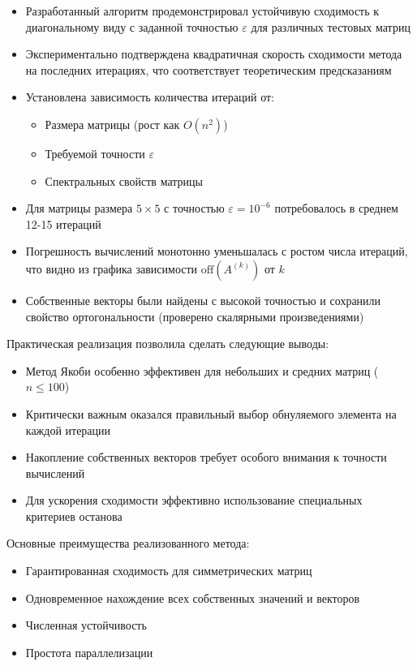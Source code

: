 \begin{itemize}
\item Разработанный алгоритм продемонстрировал устойчивую сходимость к диагональному виду с заданной точностью $\varepsilon$ для различных тестовых матриц

\item Экспериментально подтверждена квадратичная скорость сходимости метода на последних итерациях, что соответствует теоретическим предсказаниям

\item Установлена зависимость количества итераций от:
\begin{itemize}
\item Размера матрицы (рост как $O(n^2)$)
\item Требуемой точности $\varepsilon$
\item Спектральных свойств матрицы
\end{itemize}

\item Для матрицы размера $5 \times 5$ с точностью $\varepsilon = 10^{-6}$ потребовалось в среднем 12-15 итераций

\item Погрешность вычислений монотонно уменьшалась с ростом числа итераций, что видно из графика зависимости $\mathrm{off}(A^{(k)})$ от $k$

\item Собственные векторы были найдены с высокой точностью и сохранили свойство ортогональности (проверено скалярными произведениями)
\end{itemize}

Практическая реализация позволила сделать следующие выводы:
\begin{itemize}
\item Метод Якоби особенно эффективен для небольших и средних матриц ($n \leq 100$)
\item Критически важным оказался правильный выбор обнуляемого элемента на каждой итерации
\item Накопление собственных векторов требует особого внимания к точности вычислений
\item Для ускорения сходимости эффективно использование специальных критериев останова
\end{itemize}

Основные преимущества реализованного метода:
\begin{itemize}
\item Гарантированная сходимость для симметрических матриц
\item Одновременное нахождение всех собственных значений и векторов
\item Численная устойчивость
\item Простота параллелизации
\end{itemize}

